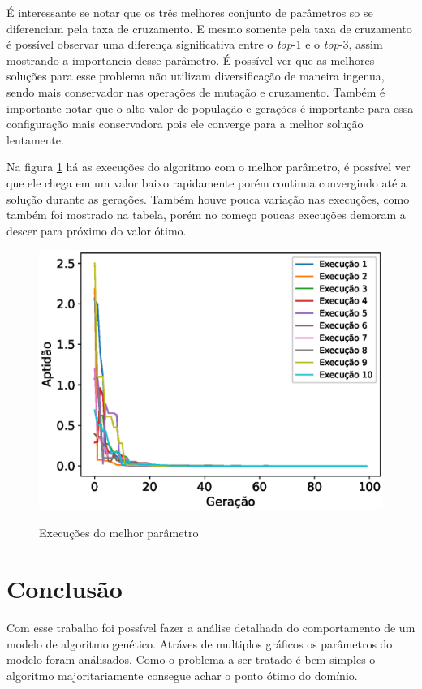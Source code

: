 \documentclass[11pt]{article}
\begin{document}
É interessante se notar que os três melhores conjunto de parâmetros so se diferenciam pela taxa de cruzamento. E mesmo somente pela taxa de cruzamento é possível observar uma diferença significativa entre o \emph{top}-1 e o \emph{top}-3, assim mostrando a importancia desse parâmetro. É possível ver que as melhores soluções para esse problema não utilizam diversificação de maneira ingenua, sendo mais conservador nas operações de mutação e cruzamento. Também é importante notar que o alto valor de população e gerações é importante para essa configuração mais conservadora pois ele converge para a melhor solução lentamente.

Na figura \ref{fig:best_executions} há as execuções do algoritmo com o melhor parâmetro, é possível ver que ele chega em um valor baixo rapidamente porém continua convergindo até a solução durante as gerações. Também houve pouca variação nas execuções, como também foi mostrado na tabela, porém no começo poucas execuções demoram a descer para próximo do valor ótimo.

\begin{figure}[!htb]
	\centering
	\includegraphics[scale=0.5]{../img/best_executions.eps}
	\label{fig:best_executions}
	\caption{Execuções do melhor parâmetro}
\end{figure}


\section{Conclusão}
\label{sec:orga91e6e6}

Com esse trabalho foi possível fazer a análise detalhada do comportamento de um modelo de algoritmo genético. Atráves de multiplos gráficos os parâmetros do modelo foram análisados. Como o problema a ser tratado é bem simples o algoritmo majoritariamente consegue achar o ponto ótimo do domínio.



\end{document}
